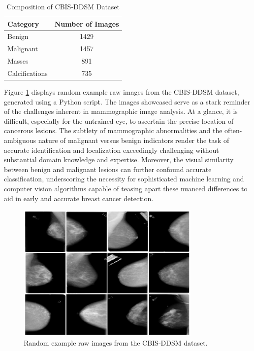 \begin{table}[h]
\centering
\caption{Composition of CBIS-DDSM Dataset}
\label{tab:dataset-composition}
\begin{tabular}{|l|c|}
\hline
\textbf{Category} & \textbf{Number of Images} \\
\hline
Benign & 1429 \\
Malignant & 1457 \\
Masses & 891 \\
Calcifications & 735 \\
\hline
\end{tabular}
\end{table}

Figure \ref{fig:breast_cancer} displays random example raw images from the CBIS-DDSM dataset, generated using a Python script. The images showcased serve as a stark reminder of the challenges inherent in mammographic image analysis. At a glance, it is difficult, especially for the untrained eye, to ascertain the precise location of cancerous lesions. The subtlety of mammographic abnormalities and the often-ambiguous nature of malignant versus benign indicators render the task of accurate identification and localization exceedingly challenging without substantial domain knowledge and expertise. Moreover, the visual similarity between benign and malignant lesions can further confound accurate classification, underscoring the necessity for sophisticated machine learning and computer vision algorithms capable of teasing apart these nuanced differences to aid in early and accurate breast cancer detection.

\begin{figure}[h]
    \centering
    \includegraphics[width=0.8\textwidth]{figures/breast_cancer.png}
    \caption{Random example raw images from the CBIS-DDSM dataset.}
    \label{fig:breast_cancer}
\end{figure}


